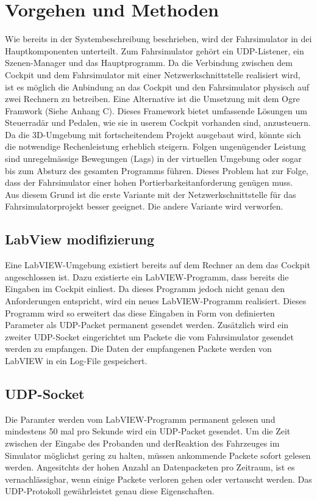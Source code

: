 \section{Vorgehen und Methoden}
Wie bereits in der Systembeschreibung beschrieben, wird der Fahrsimulator in dei Hauptkomponenten unterteilt. Zum Fahrsimulator gehört ein UDP-Listener, ein Szenen-Manager und das Hauptprogramm. Da die Verbindung zwischen dem Cockpit und dem Fahrsimulator mit einer Netzwerkschnittstelle realisiert wird, ist es möglich die Anbindung an das Cockpit und den Fahrsimulator physisch auf zwei Rechnern zu betreiben. Eine Alternative ist die Umsetzung mit dem Ogre Framwork (Siehe Anhang C). Dieses Framework bietet umfassende Lösungen um Steuerradär und Pedalen, wie sie in userem Cockpit vorhanden sind, anzusteuern.\\
Da die 3D-Umgebung mit fortscheitendem Projekt ausgebaut wird, könnte sich die notwendige Rechenleistung erheblich steigern. Folgen ungenügender Leistung sind unregelmässige Bewegungen (Lags) in der virtuellen Umgebung oder sogar bis zum Absturz des gesamten Programms führen. Dieses Problem hat zur Folge, dass der Fahrsimulator einer hohen Portierbarkeitanforderung genügen muss. \\
Aus diesem Grund ist die erste Variante mit der Netzwerkschnittstelle für das Fahrsimulatorprojekt besser geeignet. Die andere Variante wird verworfen.
\subsection{LabView modifizierung}
Eine LabVIEW-Umgebung existiert bereits auf dem Rechner an dem das Cockpit angeschlossen ist. Dazu existierte ein LabVIEW-Programm, dass bereits die Eingaben im Cockpit einliest. Da dieses Programm jedoch nicht genau den Anforderungen entspricht, wird ein neues LabVIEW-Programm realisiert. Dieses Programm wird so erweitert das diese Eingaben in Form von definierten Parameter als UDP-Packet permanent gesendet werden. Zusätzlich wird ein zweiter UDP-Socket eingerichtet um Packete die vom Fahrsimulator gesendet werden zu empfangen. Die Daten der empfangenen Packete werden von LabVIEW in ein Log-File gespeichert. 
\subsection{UDP-Socket}
Die Paramter werden vom LabVIEW-Programm permanent gelesen und mindestens 50 mal pro Sekunde wird ein UDP-Packet gesendet. Um die Zeit zwischen der Eingabe des Probanden und derReaktion des Fahrzeuges im Simulator möglichst gering zu halten, müssen ankommende Packete sofort gelesen werden. Angesitchts der hohen Anzahl an Datenpacketen pro Zeitraum, ist es vernachlässigbar, wenn einige Packete verloren gehen oder vertauscht werden. Das UDP-Protokoll gewährleistet genau diese Eigenschaften. \\

